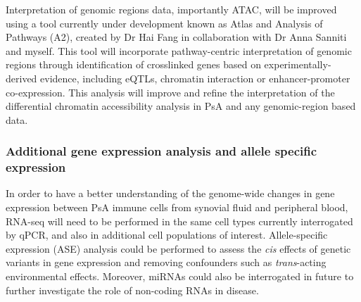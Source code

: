 Interpretation of genomic regions data, importantly ATAC, will be improved using a tool currently under development known as Atlas and Analysis of Pathways (A2), created by Dr Hai Fang in collaboration with Dr Anna Sanniti and myself. This tool will incorporate pathway-centric interpretation of genomic regions through identification of crosslinked genes based on experimentally-derived evidence, including eQTLs, chromatin interaction or enhancer-promoter co-expression. This analysis will improve and refine the interpretation of the differential chromatin accessibility analysis in PsA and any genomic-region based data.



\subsubsection{Additional gene expression analysis and allele specific expression}
In order to have a better understanding of the genome-wide changes in gene expression between PsA immune cells from synovial fluid and peripheral blood, RNA-seq will need to be performed in the same cell types currently interrogated by qPCR, and also in additional cell populations of interest. Allele-specific expression (ASE) analysis could be performed to assess the \textit{cis} effects of genetic variants in gene expression and removing confounders such as \textit{trans}-acting environmental effects. Moreover, miRNAs could also be interrogated in future to further investigate the role of non-coding RNAs in disease.%


